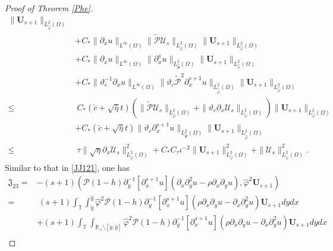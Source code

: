 \documentclass[10pt,a4paper]{amsart}
\begin{document}
\begin{proof}[Proof of Theorem \ref{Phe}]
\begin{align}
       \|\mathbf{U}_{s+1}\|_{L_{\hat{\varphi}}^{2}(\Omega)}\nonumber\\
    &+C_{*}\|\partial_{x}u\|_{L^{\infty}(\Omega)}
           \|\tilde{\mathcal{P}}\mathcal{U}_{s}\|_{L_{\tilde{\varphi}}^{2}(\Omega)}
           \|\mathbf{U}_{s+1}\|_{L_{\hat{\varphi}}^{2}(\Omega)}\nonumber\\
    &+C_{*}\|\partial_{x}u\|_{L^{\infty}(\Omega)}
           \|\partial_{x}^{s}u\|_{L_{\hat{\Psi}}^{2}(\Omega)}
           \|\mathbf{U}_{s+1}\|_{L_{\hat{\varphi}}^{2}(\Omega)}\nonumber\\
    &+C_{*}\|\vartheta_{c}^{-1}\partial_{x}u\|_{L^{\infty}(\Omega)}
           \|\vartheta_{c}\tilde{\mathcal{P}}^{2}\partial_{x}^{s+1}u\|_{L_{\tilde{\hat{\varphi}}}^{2}(\Omega)}
           \|\mathbf{U}_{s+1}\|_{L_{\hat{\varphi}}^{2}(\Omega)}\nonumber\\
\leq&~C_{*}(\check{c}+\sqrt{\bar{\eta}}t)
      \left(\|\tilde{\mathcal{P}}\mathcal{U}_{s}\|_{L_{\tilde{\varphi}}^{2}(\Omega)}
            +\|\vartheta_{c}\partial_{x}\mathcal{U}_{s}\|_{L_{\tilde{\varphi}}^{2}(\Omega)}\right)
      \|\mathbf{U}_{s+1}\|_{L_{\hat{\varphi}}^{2}(\Omega)}\nonumber\\
    &+C_{*}(\check{c}+\sqrt{\bar{\eta}}t)
      \|\vartheta_{c}\partial_{x}^{s+1}u\|_{L_{\hat{\Psi}}^{2}(\Omega)}\|\mathbf{U}_{s+1}\|_{L_{\tilde{\hat{\varphi}}}^{2}(\Omega)}\nonumber\\
\leq&~\tau\|\sqrt{\eta}\partial_{x}\mathcal{U}_{s}\|_{L_{\tilde{\varphi}}^{2}(\Omega)}^{2}
     +C_{*}C_{\tau}\iota^{-2}\|\mathbf{U}_{s+1}\|_{L_{\hat{\varphi}}^{2}(\Omega)}^{2}
     +\|\mathcal{U}_{s}\|_{L_{\tilde{\varphi}}^{2}(\Omega)}^{2}.\nonumber
\end{align}
Similar to that in \eqref{JJ121}, one has
\begin{align}\label{JJ23}
\mathfrak{J}_{23}
=&-(s+1)(\mathcal{P}(1-h)\partial_{y}^{-1}[\partial_{x}^{s+1}u](\partial_{x}\partial_{y}^{2}u-\rho\partial_{x}\partial_{y}u),\hat{\varphi}^{2}\mathbf{U}_{s+1})\\
=&~(s+1)\int_{\mathbb{T}}\int_{\check{y}}^{\hat{y}}\hat{\varphi}^{2}\mathcal{P}(1-h)\partial_{y}^{-1}[\partial_{x}^{s+1}u](\rho\partial_{x}\partial_{y}u-\partial_{x}\partial_{y}^{2}u)\mathbf{U}_{s+1}dydx\nonumber\\
 &+(s+1)\int_{\mathbb{T}}\int_{\mathbb{R}_{+}\setminus[\check{y},\hat{y}]}\hat{\varphi}^{2}\mathcal{P}(1-h)\partial_{y}^{-1}[\partial_{x}^{s+1}u](\rho\partial_{x}\partial_{y}u-\partial_{x}\partial_{y}^{2}u)\mathbf{U}_{s+1}dydx\nonumber\\

\end{align}
\end{proof}
\end{document}
